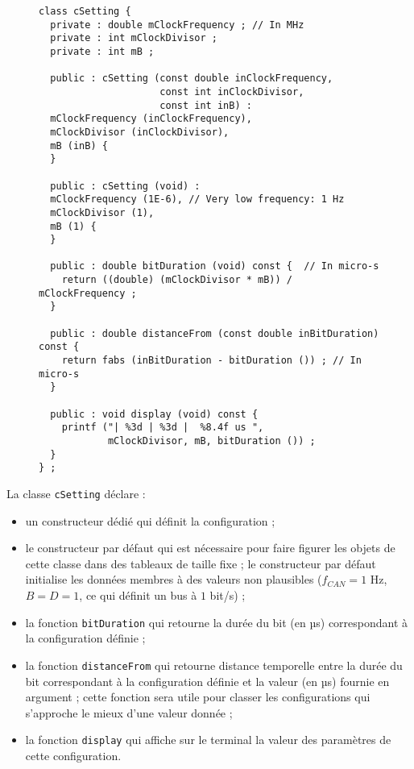 \begin{figure}[!ht]
\begin{lstlisting}
class cSetting {
  private : double mClockFrequency ; // In MHz
  private : int mClockDivisor ;
  private : int mB ;
  
  public : cSetting (const double inClockFrequency,
                     const int inClockDivisor,
                     const int inB) :
  mClockFrequency (inClockFrequency),
  mClockDivisor (inClockDivisor),
  mB (inB) {
  }
  
  public : cSetting (void) :
  mClockFrequency (1E-6), // Very low frequency: 1 Hz
  mClockDivisor (1),
  mB (1) {
  }

  public : double bitDuration (void) const {  // In micro-s
    return ((double) (mClockDivisor * mB)) / mClockFrequency ;
  }

  public : double distanceFrom (const double inBitDuration) const {
    return fabs (inBitDuration - bitDuration ()) ; // In micro-s
  }

  public : void display (void) const {
    printf ("| %3d | %3d |  %8.4f us ",
            mClockDivisor, mB, bitDuration ()) ;
  }
} ;
\end{lstlisting}
\end{figure}

La classe \texttt{cSetting} déclare :
\begin{itemize}
\item un constructeur dédié qui définit la configuration ;
\item le constructeur par défaut qui est nécessaire pour faire figurer les objets de cette classe dans des tableaux de taille fixe ; le constructeur par défaut initialise les données membres à des valeurs non plausibles ($f_{CAN} = 1$ Hz, $B = D = 1$, ce qui définit un bus à $1$ bit/s)  ;
\item la fonction \texttt{bitDuration} qui retourne la durée du bit (en µs) correspondant à la configuration définie ;
\item la fonction \texttt{distanceFrom} qui retourne distance temporelle entre la durée du bit correspondant à la configuration définie et la valeur (en µs) fournie en argument ; cette fonction sera utile pour classer les configurations qui s'approche le mieux d'une valeur donnée ;
\item la fonction \texttt{display} qui affiche sur le terminal la valeur des paramètres de cette configuration.
\end{itemize}









